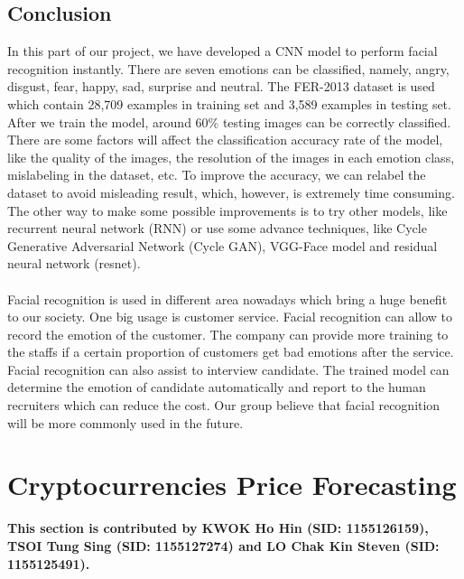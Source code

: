 \documentclass[11pt,a4paper]{article}
\begin{document}
    \subsection{Conclusion}
    In this part of our project, we have developed a CNN model to perform facial recognition instantly. There are seven emotions can be classified, namely, angry, disgust, fear, happy, sad, surprise and neutral. The FER-2013 dataset is used which contain 28,709 examples in training set and 3,589 examples in testing set. After we train the model, around 60\% testing images can be correctly classified. There are some factors will affect the classification accuracy rate of the model, like the quality of the images, the resolution of the images in each emotion class, mislabeling in the dataset, etc. To improve the accuracy, we can relabel the dataset to avoid misleading result, which, however, is extremely time consuming. The other way to make some possible improvements is to try other models, like recurrent neural network (RNN) or use some advance techniques, like Cycle Generative Adversarial Network (Cycle GAN), VGG-Face model and residual neural network (resnet). \\
    \\
    Facial recognition is used in different area nowadays which bring a huge benefit to our society. One big usage is customer service. Facial recognition can allow to record the emotion of the customer. The company can provide more training to the staffs if a certain proportion of customers get bad emotions after the service. Facial recognition can also assist to interview candidate. The trained model can determine the emotion of candidate automatically and report to the human recruiters which can reduce the cost. Our group believe that facial recognition will be more commonly used in the future.

    
    \newpage
    \section{Cryptocurrencies Price Forecasting}
    \textbf{This section is contributed by KWOK Ho Hin (SID: 1155126159), TSOI Tung Sing (SID: 1155127274) and LO Chak Kin Steven (SID: 1155125491).}
    
\end{document}
